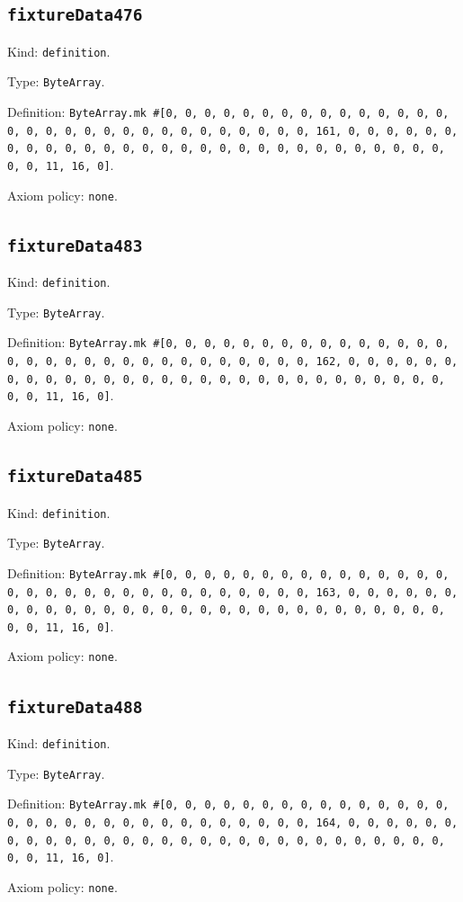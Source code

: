 \documentclass[11pt]{article}
\begin{document}
\subsection*{\texttt{fixtureData476}}
\noindent Kind: \texttt{definition}.\par
\noindent Type: \texttt{ByteArray}.\par
\noindent Definition: \texttt{ByteArray.mk \#[0, 0, 0, 0, 0, 0, 0, 0, 0, 0, 0, 0, 0, 0, 0, 0, 0, 0, 0, 0, 0, 0, 0, 0, 0, 0, 0, 0, 0, 0, 0, 161, 0, 0, 0, 0, 0, 0, 0, 0, 0, 0, 0, 0, 0, 0, 0, 0, 0, 0, 0, 0, 0, 0, 0, 0, 0, 0, 0, 0, 0, 0, 0, 11, 16, 0]}.\par
\noindent Axiom policy: \texttt{none}.\par
\subsection*{\texttt{fixtureData483}}
\noindent Kind: \texttt{definition}.\par
\noindent Type: \texttt{ByteArray}.\par
\noindent Definition: \texttt{ByteArray.mk \#[0, 0, 0, 0, 0, 0, 0, 0, 0, 0, 0, 0, 0, 0, 0, 0, 0, 0, 0, 0, 0, 0, 0, 0, 0, 0, 0, 0, 0, 0, 0, 162, 0, 0, 0, 0, 0, 0, 0, 0, 0, 0, 0, 0, 0, 0, 0, 0, 0, 0, 0, 0, 0, 0, 0, 0, 0, 0, 0, 0, 0, 0, 0, 11, 16, 0]}.\par
\noindent Axiom policy: \texttt{none}.\par
\subsection*{\texttt{fixtureData485}}
\noindent Kind: \texttt{definition}.\par
\noindent Type: \texttt{ByteArray}.\par
\noindent Definition: \texttt{ByteArray.mk \#[0, 0, 0, 0, 0, 0, 0, 0, 0, 0, 0, 0, 0, 0, 0, 0, 0, 0, 0, 0, 0, 0, 0, 0, 0, 0, 0, 0, 0, 0, 0, 163, 0, 0, 0, 0, 0, 0, 0, 0, 0, 0, 0, 0, 0, 0, 0, 0, 0, 0, 0, 0, 0, 0, 0, 0, 0, 0, 0, 0, 0, 0, 0, 11, 16, 0]}.\par
\noindent Axiom policy: \texttt{none}.\par
\subsection*{\texttt{fixtureData488}}
\noindent Kind: \texttt{definition}.\par
\noindent Type: \texttt{ByteArray}.\par
\noindent Definition: \texttt{ByteArray.mk \#[0, 0, 0, 0, 0, 0, 0, 0, 0, 0, 0, 0, 0, 0, 0, 0, 0, 0, 0, 0, 0, 0, 0, 0, 0, 0, 0, 0, 0, 0, 0, 164, 0, 0, 0, 0, 0, 0, 0, 0, 0, 0, 0, 0, 0, 0, 0, 0, 0, 0, 0, 0, 0, 0, 0, 0, 0, 0, 0, 0, 0, 0, 0, 11, 16, 0]}.\par
\noindent Axiom policy: \texttt{none}.\par
\end{document}
